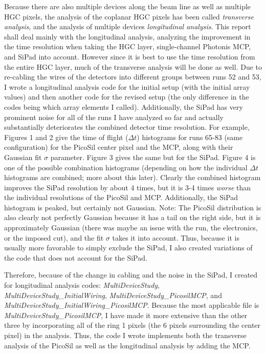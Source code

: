 \documentclass[12pt]{article}
\begin{document}
Because there are also multiple devices along the beam line as well as multiple HGC pixels, the analysis of the coplanar HGC pixels has been called \textit{transverse analysis}, and the analysis of multiple devices \textit{longitudinal analysis}. 
This report shall deal mainly with the longitudinal analysis, analyzing the improvement in the time resolution when taking the HGC layer, single-channel Photonis MCP, and SiPad into account. 
However since it is best to use the time resolution from the entire HGC layer, much of the transverse analysis will be done as well. 
Due to re-cabling the wires of the detectors into different groups between runs 52 and 53, I wrote a longitudinal analysis code for the initial setup (with the initial array values) and then another code for the revised setup (the only difference in the codes being which array elements I called). 
Additionally, the SiPad has very prominent noise for all of the runs I have analyzed so far and actually substantially deteriorates the combined detector time resolution. 
For example, Figures 1 and 2 give the time of flight ($\Delta t$) histograms for runs 65-83 (same configuration) for the PicoSil center pixel and the MCP, along with their Gaussian fit $\sigma$ parameter. 
Figure 3 gives the same but for the SiPad. 
Figure 4 is one of the possible combination histograms (depending on how the individual $\Delta t$ histograms are combined; more about this later). 
Clearly the combined histogram improves the SiPad resolution by about 4 times, but it is 3-4 times \textit{worse} than the individual resolutions of the PicoSil and MCP. 
Additionally, the SiPad histogram is peaked, but certainly not Gaussian. 
Note: The PicoSil distribution is also clearly not perfectly Gaussian because it has a tail on the right side, but it is approximately Gaussian (there was maybe an issue with the run, the electronics, or the imposed cut), and the fit $\sigma$ takes it into account. 
Thus, because it is usually more favorable to simply exclude the SiPad, I also created variations of the code that does not account for the SiPad.


Therefore, because of the change in cabling and the noise in the SiPad, I created for longitudinal analysis codes: \textit{MultiDeviceStudy}, \textit{MultiDeviceStudy\_InitialWiring}, \textit{MultiDeviceStudy\_PicosilMCP}, and \textit{MultiDeviceStudy\_InitialWiring\_PicosilMCP}. 
Because the most applicable file is \textit{MultiDeviceStudy\_PicosilMCP}, I have made it more extensive than the other three by incorporating all of the ring 1 pixels (the 6 pixels surrounding the center pixel) in the analysis. 
Thus, the code I wrote implements both the transverse analysis of the PicoSil as well as the longitudinal analysis by adding the MCP.
\end{document}
